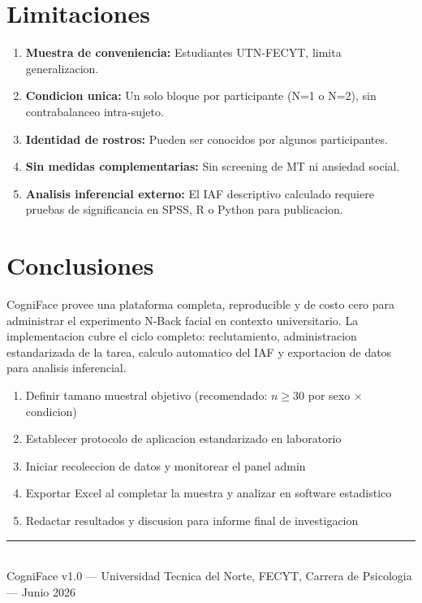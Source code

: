 \documentclass[12pt,a4paper]{article}
\begin{document}
\section{Limitaciones}

\begin{enumerate}[leftmargin=1.5em]
  \item \textbf{Muestra de conveniencia:} Estudiantes UTN-FECYT, limita generalizacion.
  \item \textbf{Condicion unica:} Un solo bloque por participante (N=1 o N=2), sin
        contrabalanceo intra-sujeto.
  \item \textbf{Identidad de rostros:} Pueden ser conocidos por algunos participantes.
  \item \textbf{Sin medidas complementarias:} Sin screening de MT ni ansiedad social.
  \item \textbf{Analisis inferencial externo:} El IAF descriptivo calculado requiere
        pruebas de significancia en SPSS, R o Python para publicacion.
\end{enumerate}

\section*{Conclusiones}

CogniFace provee una plataforma completa, reproducible y de costo cero para
administrar el experimento N-Back facial en contexto universitario. La implementacion
cubre el ciclo completo: reclutamiento, administracion estandarizada de la tarea,
calculo automatico del IAF y exportacion de datos para analisis inferencial.

\begin{tcolorbox}[successbox, title={Proximos pasos para el equipo investigador}]
\begin{enumerate}[leftmargin=1.5em]
  \item Definir tamano muestral objetivo (recomendado: $n \geq 30$ por sexo
        $\times$ condicion)
  \item Establecer protocolo de aplicacion estandarizado en laboratorio
  \item Iniciar recoleccion de datos y monitorear el panel admin
  \item Exportar Excel al completar la muestra y analizar en software estadistico
  \item Redactar resultados y discusion para informe final de investigacion
\end{enumerate}
\end{tcolorbox}

\vspace{2em}
\noindent\rule{\textwidth}{0.4pt}\\[0.3em]
{\small CogniFace v1.0 --- Universidad Tecnica del Norte,
FECYT, Carrera de Psicologia --- Junio 2026}
\end{document}
